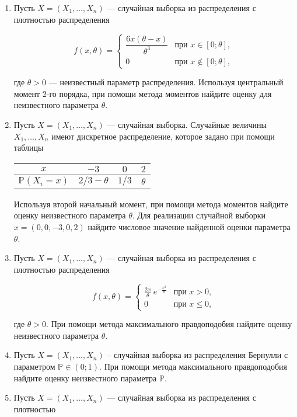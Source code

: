 \documentclass[12pt]{article}
\def \P{\mathbb{P}}
\begin{document}
\begin{enumerate}
\item Пусть $X=(X_1, \ldots ,X_n)$ — случайная выборка из распределения с плотностью распределения

\[
f(x,\theta) = 
\begin{cases} 
\dfrac{6x(\theta-x)}{\theta^3} & \text{при } x \in [0;\theta], \\ 
0 & \text{при } x \not\in [0;\theta], 
\end{cases}
\]


где $\theta > 0$ — неизвестный параметр распределения. Используя центральный момент 2-го порядка, при помощи метода моментов найдите оценку для неизвестного параметра $\theta$.

\item Пусть $X=(X_1, \ldots,X_n)$ — случайная выборка. Случайные величины $X_1, \ldots, X_n$ имеют дискретное распределение, которое задано при помощи таблицы

\begin{center}
\begin{tabular}{cccc}
\toprule
 $x$ & $-3$  &$ 0 $  & $2 $  \\ 
 \midrule
 $\P(X_i = x)$ & $2/3 - \theta$ & $1/3$ & $\theta$ \\ 
 \bottomrule
\end{tabular}
\end{center}

Используя второй начальный момент, при помощи метода моментов найдите оценку неизвестного параметра $\theta$. Для реализации случайной выборки $x=(0,0,-3,0,2)$ найдите числовое значение найденной оценки параметра $\theta$.

\item Пусть $X=(X_1, \ldots,X_n)$ — случайная выборка из распределения с плотностью распределения

\[
f(x,\theta) = 
\begin{cases} 
\frac{2x}{\theta} \ e^{-\frac{x^2}{\theta}} & \text{при } x>0, \\ 
0 & \text{при } x \leq 0, 
\end{cases}
\]

где $\theta > 0$. При помощи метода максимального правдоподобия найдите оценку неизвестного параметра $\theta$.

\item Пусть $X=(X_1, \ldots, X_n)$ – случайная выборка из распределения Бернулли с параметром $\P \in (0;1)$. При помощи метода максимального правдоподобия найдите оценку неизвестного параметра $\P$.

\item Пусть $X=(X_1, \ldots, X_n)$ — случайная выборка из распределения с плотностью


\end{enumerate}
\end{document}
